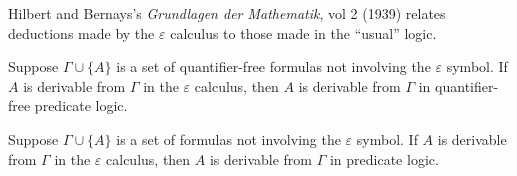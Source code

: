 \begin{node}\label{epsilon-calc-0009}%
Hilbert and Bernays's \textit{Grundlagen der Mathematik}, vol 2 (1939)
relates deductions made by the $\varepsilon$ calculus to those made in
the ``usual'' logic.

\begin{theorem}\label{epsilon-calc-000A}%
Suppose $\Gamma\cup\{A\}$ is a set of quantifier-free formulas not
involving the $\varepsilon$ symbol. If $A$ is derivable from $\Gamma$ in
the $\varepsilon$ calculus, then $A$ is derivable from $\Gamma$ in
quantifier-free predicate logic.
\end{theorem}

\begin{theorem}\label{epsilon-calc-000B}%
Suppose $\Gamma\cup\{A\}$ is a set of formulas not involving the
$\varepsilon$ symbol. If $A$ is derivable from $\Gamma$ in the
$\varepsilon$ calculus, then $A$ is derivable from $\Gamma$ in predicate
logic.
\end{theorem}
\end{node}

